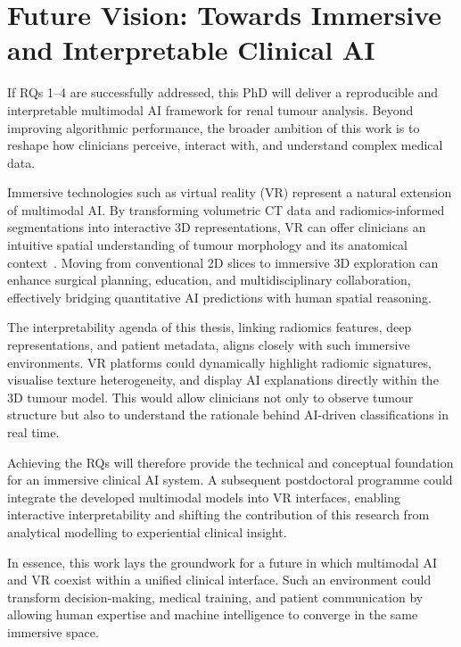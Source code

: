 \documentclass[final,british,a4paper,12pt]{phdthesis}
\begin{document}

\section{Future Vision: Towards Immersive and Interpretable Clinical AI}


If RQs 1–4 are successfully addressed, this PhD will deliver a reproducible and interpretable multimodal AI framework for renal tumour analysis. Beyond improving algorithmic performance, the broader ambition of this work is to reshape how clinicians perceive, interact with, and understand complex medical data.

Immersive technologies such as virtual reality (VR) represent a natural extension of multimodal AI. By transforming volumetric CT data and radiomics-informed segmentations into interactive 3D representations, VR can offer clinicians an intuitive spatial understanding of tumour morphology and its anatomical context~\cite{VRMed}. Moving from conventional 2D slices to immersive 3D exploration can enhance surgical planning, education, and multidisciplinary collaboration, effectively bridging quantitative AI predictions with human spatial reasoning.

The interpretability agenda of this thesis, linking radiomics features, deep representations, and patient metadata, aligns closely with such immersive environments. VR platforms could dynamically highlight radiomic signatures, visualise texture heterogeneity, and display AI explanations directly within the 3D tumour model. This would allow clinicians not only to observe tumour structure but also to understand the rationale behind AI-driven classifications in real time.

Achieving the RQs will therefore provide the technical and conceptual foundation for an immersive clinical AI system. A subsequent postdoctoral programme could integrate the developed multimodal models into VR interfaces, enabling interactive interpretability and shifting the contribution of this research from analytical modelling to experiential clinical insight.

In essence, this work lays the groundwork for a future in which multimodal AI and VR coexist within a unified clinical interface. Such an environment could transform decision-making, medical training, and patient communication by allowing human expertise and machine intelligence to converge in the same immersive space.
\end{document}
